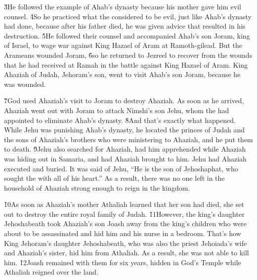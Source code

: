 \v{3}He followed the example of Ahab's dynasty because his mother gave him evil counsel. \v{4}So he practiced what the  considered to be evil, just like Ahab's dynasty had done, because after his father died, he was given advice that resulted in his destruction. \v{5}He followed their counsel and accompanied Ahab's son Joram, king of Israel, to wage war against King Hazael of Aram at Ramoth-gilead. But the Arameans wounded Joram, \v{6}so he returned to Jezreel to recover from the wounds that he had received at Ramah in the battle against King Hazael of Aram. King Ahaziah of Judah, Jehoram's son, went to visit Ahab's son Joram, because he was wounded.

\v{7}God used Ahaziah's visit to Joram to destroy Ahaziah. As soon as he arrived, Ahaziah went out with Joram to attack Nimshi's son Jehu, whom the  had appointed to eliminate Ahab's dynasty. \v{8}And that's exactly what happened. While Jehu was punishing Ahab's dynasty, he located the princes of Judah and the sons of Ahaziah's brothers who were ministering to Ahaziah, and he put them to death. \v{9}Jehu also searched for Ahaziah, had him apprehended while Ahaziah was hiding out in Samaria, and had Ahaziah brought to him. Jehu had Ahaziah executed and buried. It was said of Jehu, ``He is the son of Jehoshaphat, who sought the  with all of his heart.'' As a result, there was no one left in the household of Ahaziah strong enough to reign in the kingdom.

\v{10}As soon as Ahaziah's mother Athaliah learned that her son had died, she set out to destroy the entire royal family of Judah. \v{11}However, the king's daughter Jehoshabeath took Ahaziah's son Joash away from the king's children who were about to be assassinated and hid him and his nurse in a bedroom. That's how King Jehoram's daughter Jehoshabeath, who was also the priest Jehoiada's wife and Ahaziah's sister, hid him from Athaliah. As a result, she was not able to kill him. \v{12}Joash remained with them for six years, hidden in God's Temple while Athaliah reigned over the land.

